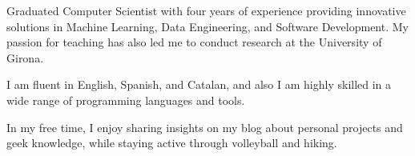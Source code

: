 

\begin{cvparagraph}


Graduated Computer Scientist with four years of experience providing innovative solutions in Machine Learning, Data Engineering, and Software Development. My passion for teaching has also led me to conduct research at the University of Girona.

I am fluent in English, Spanish, and Catalan, and also I am highly skilled in a wide range of programming languages and tools.

In my free time, I enjoy sharing insights on my blog about personal projects and geek knowledge, while staying active through volleyball and hiking.


\end{cvparagraph}
